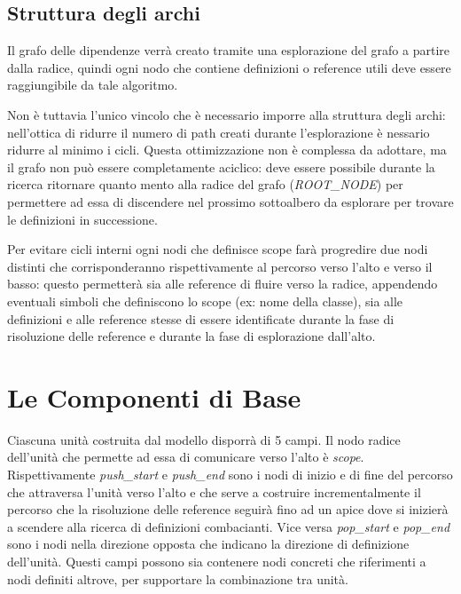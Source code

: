 \subsection{Struttura degli archi}

Il grafo delle dipendenze verr\`a creato tramite una esplorazione del grafo a partire dalla radice, quindi ogni nodo che contiene definizioni o reference utili deve essere raggiungibile da tale algoritmo.

\par
Non \`e tuttavia l'unico vincolo che \`e necessario imporre alla struttura degli archi: nell'ottica di ridurre il numero di path creati durante l'esplorazione \`e nessario ridurre al minimo i cicli.
Questa ottimizzazione non \`e complessa da adottare, ma il grafo non pu\`o essere completamente aciclico: deve essere possibile durante la ricerca ritornare quanto mento alla radice del grafo (\emph{ROOT\_NODE}) per permettere ad essa di discendere nel prossimo sottoalbero da esplorare per trovare le definizioni in successione.

\par
Per evitare cicli interni ogni nodi che definisce scope far\`a progredire due nodi distinti che corrisponderanno rispettivamente al percorso verso l'alto e verso il basso: questo permetter\`a sia alle reference di fluire verso la radice, appendendo eventuali simboli che definiscono lo scope (ex: nome della classe), sia alle definizioni e alle reference stesse di essere identificate durante la fase di risoluzione delle reference e durante la fase di esplorazione dall'alto.

\section{Le Componenti di Base}

Ciascuna unit\`a costruita dal modello disporr\`a di 5 campi.
Il nodo radice dell'unit\`a che permette ad essa di comunicare verso l'alto \`e \emph{scope}.
Rispettivamente \emph{push\_start} e \emph{push\_end} sono i nodi di inizio e di fine del percorso che attraversa l'unit\`a verso l'alto e che serve a costruire incrementalmente il percorso che la risoluzione delle reference seguir\`a fino ad un apice dove si inizier\`a a scendere alla ricerca di definizioni combacianti.
Vice versa \emph{pop\_start} e \emph{pop\_end} sono i nodi nella direzione opposta che indicano la direzione di definizione dell'unit\`a.
Questi campi possono sia contenere nodi concreti che riferimenti a nodi definiti altrove, per supportare la combinazione tra unit\`a.


